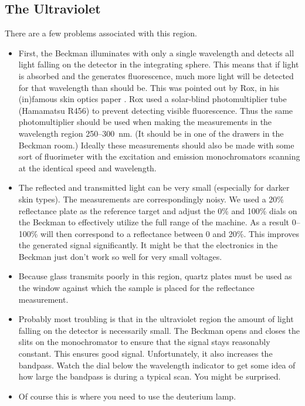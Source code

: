 \documentclass{article}
\begin{document}
\subsection*{The Ultraviolet}
There are a few problems associated with this region.  

\begin{itemize}

\item
First, the Beckman illuminates with only a single wavelength and detects all light
falling on the detector in the integrating sphere.  This means that if light is
absorbed and the generates fluorescence, much more light will be detected for that
wavelength than should be.  This was pointed out by Rox, in his (in)famous skin optics 
paper \cite{anderson81b}. Rox used a solar-blind photomultiplier tube (Hamamatsu R456)
to prevent detecting visible fluorescence. Thus the same photomultiplier should be used
when making the measurements in the wavelength region 250--300~nm. (It should be in one
of the drawers in the Beckman room.) Ideally these measurements should also be made
with some sort of fluorimeter with the excitation and emission monochromators scanning
at the identical speed and wavelength.

\item
The reflected and transmitted light can be very small (especially for darker skin
types).  The measurements are correspondingly noisy.  We used a 20\% reflectance
plate as the reference target and adjust the 0\% and 100\% dials on the Beckman to
effectively utilize the full range of the machine. As a result 0--100\% will then
correspond to a reflectance between 0 and 20\%.  This improves the generated signal
significantly.  It might be that the electronics in the Beckman just don't work so
well for very small voltages.

\item
Because glass transmits poorly in this region, quartz plates must be used as the
window against which the sample is placed for the reflectance measurement.

\item
Probably most troubling is that in the ultraviolet region the amount of light
falling on the detector is necessarily small.  The Beckman opens and closes the
slits on the monochromator to ensure that the signal stays reasonably constant.
This ensures good signal.  Unfortunately, it also increases the bandpass.  Watch
the dial below the wavelength indicator to get some idea of how large the bandpass
is during a typical scan.  You might be surprised.

\item
Of course this is where you need to use the deuterium lamp.
\end{itemize}
\end{document}
